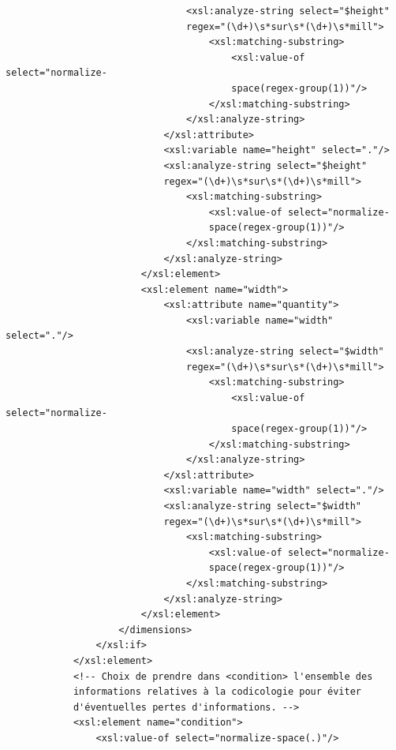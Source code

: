 \documentclass[a4paper,12pt,twoside]{book}
\begin{document}
\begin{verbatim}
                                <xsl:analyze-string select="$height" 
                                regex="(\d+)\s*sur\s*(\d+)\s*mill">
                                    <xsl:matching-substring>
                                        <xsl:value-of select="normalize-
                                        space(regex-group(1))"/>
                                    </xsl:matching-substring>
                                </xsl:analyze-string>
                            </xsl:attribute>
                            <xsl:variable name="height" select="."/>
                            <xsl:analyze-string select="$height" 
                            regex="(\d+)\s*sur\s*(\d+)\s*mill">
                                <xsl:matching-substring>
                                    <xsl:value-of select="normalize-
                                    space(regex-group(1))"/>
                                </xsl:matching-substring>
                            </xsl:analyze-string>
                        </xsl:element>
                        <xsl:element name="width">
                            <xsl:attribute name="quantity">
                                <xsl:variable name="width" select="."/>
                                <xsl:analyze-string select="$width" 
                                regex="(\d+)\s*sur\s*(\d+)\s*mill">
                                    <xsl:matching-substring>
                                        <xsl:value-of select="normalize-
                                        space(regex-group(1))"/>
                                    </xsl:matching-substring>
                                </xsl:analyze-string>
                            </xsl:attribute>
                            <xsl:variable name="width" select="."/>
                            <xsl:analyze-string select="$width" 
                            regex="(\d+)\s*sur\s*(\d+)\s*mill">
                                <xsl:matching-substring>
                                    <xsl:value-of select="normalize-
                                    space(regex-group(1))"/>
                                </xsl:matching-substring>
                            </xsl:analyze-string>
                        </xsl:element>
                    </dimensions>
                </xsl:if>
            </xsl:element>
            <!-- Choix de prendre dans <condition> l'ensemble des 
            informations relatives à la codicologie pour éviter 
            d'éventuelles pertes d'informations. -->
            <xsl:element name="condition">
                <xsl:value-of select="normalize-space(.)"/>

\end{verbatim}
\end{document}
